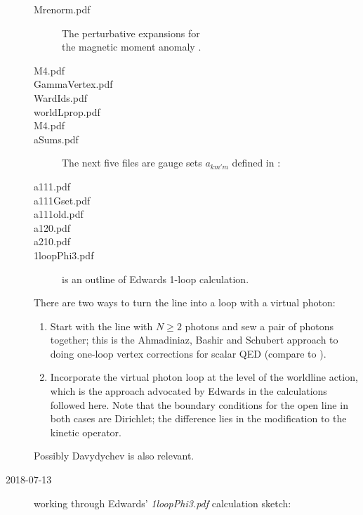 \begin{description}
\begin{description}
  \item[Mrenorm.pdf]
The perturbative expansions for\\
the magnetic moment anomaly .
  \item[M4.pdf]
  \item[GammaVertex.pdf]
  \item[WardIds.pdf]
  \item[worldLprop.pdf]
  \item[M4.pdf]
  \item[aSums.pdf]
The next five files are gauge sets $a_{km'm}$ defined in :
  \item[a111.pdf]
  \item[a111Gset.pdf]
  \item[a111old.pdf]
  \item[a120.pdf]
  \item[a210.pdf]
  \item[1loopPhi3.pdf] is an outline of Edwards 1-loop calculation.
\end{description}
    There are two ways to turn the line into a loop with a virtual photon:
    \begin{enumerate}
	\item
Start with the line with $N \geqslant 2$ photons and sew a pair of photons
together; this is the Ahmadiniaz, Bashir and Schubert approach to
doing one-loop vertex corrections for scalar QED (compare to
).
	\item
Incorporate the virtual photon loop at the level of the worldline
action, which is the approach advocated by Edwards in
the calculations followed here. Note that the boundary conditions
for the open line in both cases are Dirichlet; the
difference lies in the modification to the kinetic operator.
    \end{enumerate}
Possibly Davydychev is also relevant.


\item[2018-07-13] %
working through Edwards' {\em 1loopPhi3.pdf} calculation sketch:


\end{description}
